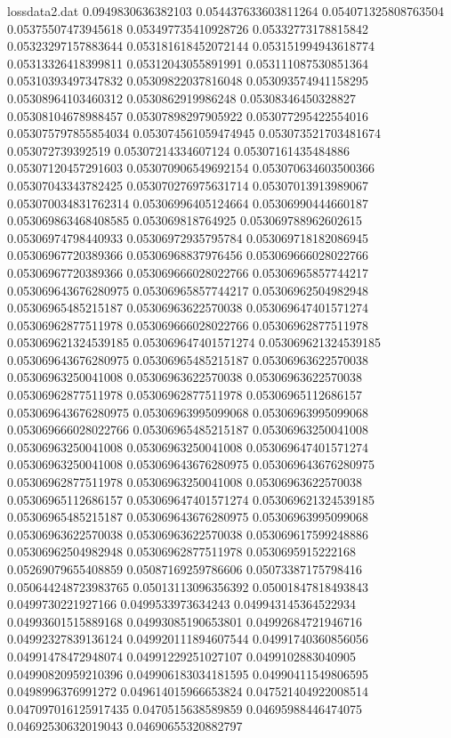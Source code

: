 \begin{filecontents*}{lossdata2.dat}
0.0949830636382103
0.054437633603811264
0.054071325808763504
0.05375507473945618
0.053497735410928726
0.05332773178815842
0.05323297157883644
0.053181618452072144
0.053151994943618774
0.05313326418399811
0.05312043055891991
0.053111087530851364
0.05310393497347832
0.05309822037816048
0.053093574941158295
0.05308964103460312
0.0530862919986248
0.05308346450328827
0.05308104678988457
0.05307898297905922
0.053077295422554016
0.053075797855854034
0.053074561059474945
0.053073521703481674
0.053072739392519
0.05307214334607124
0.05307161435484886
0.05307120457291603
0.053070906549692154
0.053070634603500366
0.05307043343782425
0.053070276975631714
0.05307013913989067
0.053070034831762314
0.05306996405124664
0.05306990444660187
0.053069863468408585
0.053069818764925
0.053069788962602615
0.05306974798440933
0.05306972935795784
0.053069718182086945
0.05306967720389366
0.05306968837976456
0.053069666028022766
0.05306967720389366
0.053069666028022766
0.05306965857744217
0.053069643676280975
0.05306965857744217
0.05306962504982948
0.05306965485215187
0.05306963622570038
0.053069647401571274
0.05306962877511978
0.053069666028022766
0.05306962877511978
0.053069621324539185
0.053069647401571274
0.053069621324539185
0.053069643676280975
0.05306965485215187
0.05306963622570038
0.05306963250041008
0.05306963622570038
0.05306963622570038
0.05306962877511978
0.05306962877511978
0.05306965112686157
0.053069643676280975
0.05306963995099068
0.05306963995099068
0.053069666028022766
0.05306965485215187
0.05306963250041008
0.05306963250041008
0.05306963250041008
0.053069647401571274
0.05306963250041008
0.053069643676280975
0.053069643676280975
0.05306962877511978
0.05306963250041008
0.05306963622570038
0.05306965112686157
0.053069647401571274
0.053069621324539185
0.05306965485215187
0.053069643676280975
0.05306963995099068
0.05306963622570038
0.05306963622570038
0.053069617599248886
0.05306962504982948
0.05306962877511978
0.0530695915222168
0.05269079655408859
0.05087169259786606
0.05073387175798416
0.050644248723983765
0.05013113096356392
0.05001847818493843
0.0499730221927166
0.0499533973634243
0.049943145364522934
0.04993601515889168
0.04993085190653801
0.04992684721946716
0.04992327839136124
0.049920111894607544
0.04991740360856056
0.04991478472948074
0.04991229251027107
0.0499102883040905
0.04990820959210396
0.049906183034181595
0.04990411549806595
0.0498996376991272
0.049614015966653824
0.047521404922008514
0.047097016125917435
0.0470515638589859
0.04695988446474075
0.04692530632019043
0.04690655320882797

\end{filecontents*}
